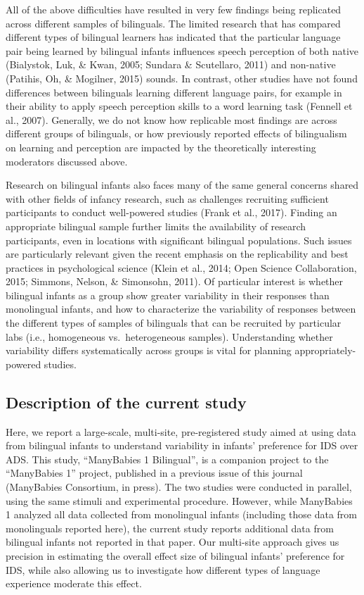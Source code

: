 \documentclass[,man,floatsintext]{apa6}
\begin{document}
All of the above difficulties have resulted in very few findings being replicated across different samples of bilinguals. The limited research that has compared different types of bilingual learners has indicated that the particular language pair being learned by bilingual infants influences speech perception of both native (Bialystok, Luk, \& Kwan, 2005; Sundara \& Scutellaro, 2011) and non-native (Patihis, Oh, \& Mogilner, 2015) sounds. In contrast, other studies have not found differences between bilinguals learning different language pairs, for example in their ability to apply speech perception skills to a word learning task (Fennell et al., 2007). Generally, we do not know how replicable most findings are across different groups of bilinguals, or how previously reported effects of bilingualism on learning and perception are impacted by the theoretically interesting moderators discussed above.

Research on bilingual infants also faces many of the same general concerns shared with other fields of infancy research, such as challenges recruiting sufficient participants to conduct well-powered studies (Frank et al., 2017). Finding an appropriate bilingual sample further limits the availability of research participants, even in locations with significant bilingual populations. Such issues are particularly relevant given the recent emphasis on the replicability and best practices in psychological science (Klein et al., 2014; Open Science Collaboration, 2015; Simmons, Nelson, \& Simonsohn, 2011). Of particular interest is whether bilingual infants as a group show greater variability in their responses than monolingual infants, and how to characterize the variability of responses between the different types of samples of bilinguals that can be recruited by particular labs (i.e., homogeneous vs.~heterogeneous samples). Understanding whether variability differs systematically across groups is vital for planning appropriately-powered studies.

\hypertarget{description-of-the-current-study}{%
\subsection{Description of the current study}\label{description-of-the-current-study}}

Here, we report a large-scale, multi-site, pre-registered study aimed at using data from bilingual infants to understand variability in infants' preference for IDS over ADS. This study, \enquote{ManyBabies 1 Bilingual}, is a companion project to the \enquote{ManyBabies 1} project, published in a previous issue of this journal (ManyBabies Consortium, in press). The two studies were conducted in parallel, using the same stimuli and experimental procedure. However, while ManyBabies 1 analyzed all data collected from monolingual infants (including those data from monolinguals reported here), the current study reports additional data from bilingual infants not reported in that paper. Our multi-site approach gives us precision in estimating the overall effect size of bilingual infants' preference for IDS, while also allowing us to investigate how different types of language experience moderate this effect.
\end{document}
